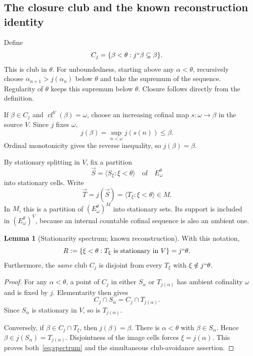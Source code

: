 \documentclass[11pt,letterpaper]{article}
\theoremstyle{definition}
\newtheorem{lemma}[definition]{Lemma}
\newcommand{\cf}{\operatorname{cf}}
\theoremstyle{remark}
\begin{document}
\subsection{The closure club and the known reconstruction identity}

Define
\[
 C_j=\{\beta<\theta:j``\beta\subseteq\beta\}.
\]
This is club in $\theta$. For unboundedness, starting above any $\alpha<\theta$, recursively choose $\alpha_{n+1}>j(\alpha_n)$ below $\theta$ and take the supremum of the sequence. Regularity of $\theta$ keeps this supremum below $\theta$. Closure follows directly from the definition.

If $\beta\in C_j$ and $\cf^V(\beta)=\omega$, choose an increasing cofinal map $s:\omega\to\beta$ in the source $V$. Since $j$ fixes $\omega$,
\[
 j(\beta)=\sup_{n<\omega}j(s(n))\leq\beta.
\]
Ordinal monotonicity gives the reverse inequality, so $j(\beta)=\beta$.

By stationary splitting in $V$, fix a partition
\[
 \vec S=\langle S_\xi:\xi<\theta\rangle
 \quad\text{of}\quad E^\theta_\omega
\]
into stationary cells. Write
\[
 \vec T=j(\vec S)=\langle T_\xi:\xi<\theta\rangle\in M.
\]
In $M$, this is a partition of $(E^\theta_\omega)^M$ into stationary sets. Its support is included in $(E^\theta_\omega)^V$, because an internal countable cofinal sequence is also an ambient one.

\begin{lemma}[Stationarity spectrum; known reconstruction]\label{lem:spectrum}
With this notation,
\begin{equation}
 R:=\{\xi<\theta:T_\xi\text{ is stationary in }V\}=j``\theta.\label{eq:spectrum}
\end{equation}
Furthermore, the \emph{same} club $C_j$ is disjoint from every $T_\xi$ with $\xi\notin j``\theta$.
\end{lemma}

\begin{proof}
For any $\alpha<\theta$, a point of $C_j$ in either $S_\alpha$ or $T_{j(\alpha)}$ has ambient cofinality $\omega$ and is fixed by $j$. Elementarity then gives
\[
 C_j\cap S_\alpha=C_j\cap T_{j(\alpha)}.
\]
Since $S_\alpha$ is stationary in $V$, so is $T_{j(\alpha)}$.

Conversely, if $\beta\in C_j\cap T_\xi$, then $j(\beta)=\beta$. There is $\alpha<\theta$ with $\beta\in S_\alpha$. Hence
$\beta\in j(S_\alpha)=T_{j(\alpha)}$. Disjointness of the image cells forces $\xi=j(\alpha)$. This proves both~\eqref{eq:spectrum} and the simultaneous club-avoidance assertion.
\end{proof}
\end{document}
